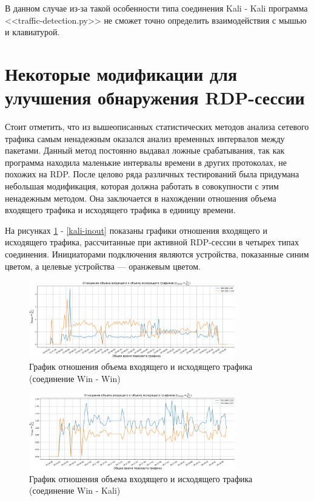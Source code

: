 \documentclass[bachelor, och, coursework]{SCWorks}
\begin{document}
В данном случае из-за такой особенности типа соединения Kali - Kali программа <<traffic-detection.py>> не сможет точно определить 
взаимодействия с мышью и клавиатурой.



\section{Некоторые модификации для улучшения обнаружения RDP-сессии}


Стоит отметить, что из вышеописанных статистических методов анализа сетевого трафика самым ненадежным оказался анализ временных интервалов между пакетами.
Данный метод постоянно выдавал ложные срабатывания, так как программа находила маленькие интервалы времени в других протоколах, не похожих на RDP. 
После целово ряда различных тестирований была придумана небольшая модификация, которая должна работать в совокупности с этим ненадежным методом.
Она заключается в нахождении отношения объема входящего трафика и исходящего трафика в единицу времени. 

На рисунках \ref{win-inout} - \ref{kali-inout} показаны графики отношения входящего и исходящего трафика, рассчитанные
при активной RDP-сессии в четырех типах соединения. Инициаторами подключения являются устройства, показанные синим цветом, 
а целевые устройства --- оранжевым цветом.


\begin{figure}[H]
  \centering
  \includegraphics[width=0.8\textwidth]{photo/inout-win.png}
  \caption{График отношения объема входящего и исходящего трафика (соединение Win - Win)}
  \label{win-inout}
\end{figure}


\begin{figure}[H]
  \centering
  \includegraphics[width=0.8\textwidth]{photo/inout-winkal.png}
  \caption{График отношения объема входящего и исходящего трафика (соединение Win - Kali)}
  \label{winkal-inout}
\end{figure}
\end{document}
